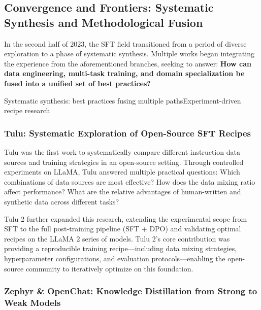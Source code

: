 \subsection{Convergence and Frontiers: Systematic Synthesis and Methodological Fusion}
\label{sec:t1-convergence}

In the second half of 2023, the SFT field transitioned from a period of diverse exploration to a phase of systematic synthesis.
Multiple works began integrating the experience from the aforementioned branches, seeking to answer:
\textbf{How can data engineering, multi-task training, and domain specialization
be fused into a unified set of best practices?}

%
  {Systematic synthesis: best practices fusing multiple paths}{Experiment-driven recipe research}


\subsubsection{Tulu: Systematic Exploration of Open-Source SFT Recipes}
\label{sec:t1-tulu}

Tulu \citep{wang2023tulu} was the first work to systematically compare different instruction data
sources and training strategies in an open-source setting.
Through controlled experiments on LLaMA, Tulu answered multiple practical questions:
Which combinations of data sources are most effective? How does the data mixing ratio affect performance?
What are the relative advantages of human-written and synthetic data across different tasks?

Tulu 2 \citep{ivison2023tulu2} further expanded this research,
extending the experimental scope from SFT to the full post-training pipeline (SFT + DPO)
and validating optimal recipes on the LLaMA 2 series of models.
Tulu 2's core contribution was providing a reproducible training recipe---including
data mixing strategies, hyperparameter configurations, and evaluation protocols---enabling
the open-source community to iteratively optimize on this foundation.

\subsubsection{Zephyr \& OpenChat: Knowledge Distillation from Strong to Weak Models}
\label{sec:t1-distillation}

